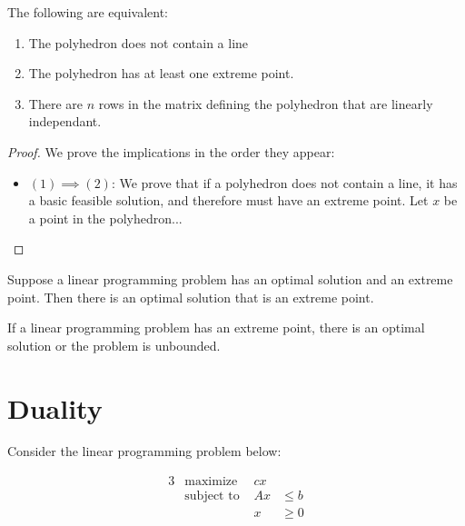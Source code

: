     \begin{theorem}
        The following are equivalent:

        \begin{enumerate}
            \item The polyhedron does not contain a line
            \item The polyhedron has at least one extreme point.
            \item There are $n$ rows in the matrix defining the polyhedron that are linearly independant.
        \end{enumerate}
    \end{theorem}

    \begin{proof}
        We prove the implications in the order they appear:

        \begin{itemize}
            \item $(1) \implies (2)$: We prove that if a polyhedron does not contain a line, it has a basic feasible solution, and therefore must have an extreme point. Let $x$ be a point in the polyhedron...
        \end{itemize}
    \end{proof}

    \begin{theorem}
        Suppose a linear programming problem has an optimal solution and an extreme point. Then there is an optimal solution that is an extreme point.
    \end{theorem}

    \begin{theorem}
        If a linear programming problem has an extreme point, there is an optimal solution or the problem is unbounded.
    \end{theorem}

    \chapter{Duality}

    Consider the linear programming problem below:

    \begin{alignat*}{3}
        &\text{maximize } & cx\\
        &\text{subject to } & Ax &\leq b\\
        &                  & x &\geq 0
    \end{alignat*}

